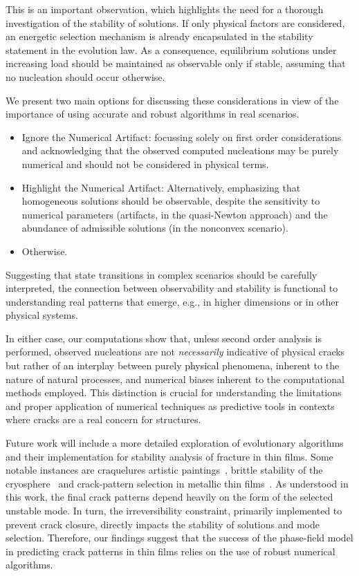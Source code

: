 This is an important observation, which highlights the need for a thorough investigation of the stability of solutions. 
If only physical factors are considered, an energetic selection mechanism is already encapsulated in the stability statement in the evolution law. As a consequence, equilibrium solutions under increasing load should be maintained as observable only if stable, assuming that no nucleation should occur otherwise.

We present two main options for discussing these considerations in view of the importance of using accurate and robust algorithms in real scenarios.

\begin{itemize}
    \item 
    Ignore the Numerical Artifact: focussing solely on first order considerations and acknowledging that the observed computed nucleations may be purely numerical and should not be considered in physical terms.
    \item 
    Highlight the Numerical Artifact: Alternatively, emphasizing that homogeneous solutions should be observable, despite 
    the sensitivity to numerical parameters (artifacts, in the quasi-Newton approach) and the abundance of admissible solutions (in the nonconvex scenario).
    \item 
    Otherwise.
\end{itemize}

Suggesting that state transitions in complex scenarios should be carefully interpreted, the connection between observability and stability is functional to understanding real patterns that emerge, e.g., in higher dimensions or in other physical systems.

In either case, our computations show that, unless second order analysis is performed, observed nucleations are not \emph{necessarily} indicative of physical cracks but rather of an interplay between purely   \textcolor{black}{physical} phenomena, inherent to the nature of natural processes, and numerical biases inherent to the computational methods employed. This distinction is crucial for understanding the limitations and proper application of numerical techniques as predictive tools in contexts where cracks are a real concern for structures.


Future work will include a more detailed exploration of evolutionary algorithms and their implementation for stability analysis of fracture in thin films. Some notable instances are craquelures artistic paintings~\cite{fuster-lopez:2020-picassos, Bosco:2020aa,Bosco:2021},  brittle stability of the cryosphere~\cite{weiss:2017-linking, tollefson:2017-giant, Sun:2023aa, Millan:2023aa} and crack-pattern selection in metallic thin films~\cite{Faurie2019-to}. {As understood in this work, the final crack patterns depend heavily on the form of the selected unstable mode. In turn, the irreversibility constraint, primarily implemented to prevent crack closure, directly impacts the stability of solutions and mode selection. Therefore, our findings suggest that the success of the phase-field model in predicting crack patterns in thin films relies on the use of robust numerical algorithms.}

